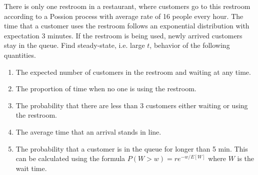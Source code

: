   \item There is only one restroom in a restaurant, where customers go to this
    restroom according to a
    Possion process with average rate of 16 people every hour. The time that a
    customer uses the restroom follows an exponential distribution with expectation
    3 minutes. If the restroom is being used, newly arrived customers stay in the queue.
    Find steady-state, i.e. large $t$, behavior of the following quantities.
    \begin{enumerate}
      \item The expected number of customers in the restroom and waiting at any time.
      \item The proportion of time when no one is using the restroom.
      \item The probability that there are less than 3 customers either waiting
        or using the restroom.
      \item The average time that an arrival stands in line.
      \item The probability that a customer is in the queue for longer than 5 min. This can be calculated using the formula $P(W > w) = re^{-w/E[W]}$ where $W$ is the wait time. 
    \end{enumerate}
